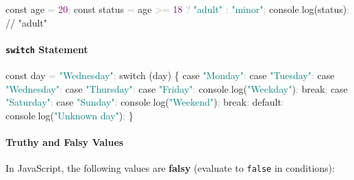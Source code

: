 \documentclass[
  justified,
  openright,
]{tufte-book}
\let\subsubsection\paragraph
\let\paragraph\paragraph
\newcommand{\BuiltInTok}[1]{#1}
\newcommand{\CommentTok}[1]{\textcolor{MidGray}{#1}}
\newcommand{\ControlFlowTok}[1]{\textcolor{BrandBlue}{#1}}
\newcommand{\DecValTok}[1]{\textcolor{Purple}{#1}}
\newcommand{\FunctionTok}[1]{\textcolor{BrandBlue}{#1}}
\newcommand{\KeywordTok}[1]{\textcolor{BrandBlue}{#1}}
\newcommand{\NormalTok}[1]{#1}
\newcommand{\OperatorTok}[1]{\textcolor{DarkGray}{#1}}
\newcommand{\StringTok}[1]{\textcolor{Teal}{#1}}
\newenvironment{Shaded}{%
  \begin{snugshade}
}{%
  \end{snugshade}
}
\let\subsubsection\paragraph
\let\paragraph\paragraph
\begin{document}
\begin{Shaded}
\begin{Highlighting}[]
\KeywordTok{const}\NormalTok{ age }\OperatorTok{=} \DecValTok{20}\OperatorTok{;}
\KeywordTok{const}\NormalTok{ status }\OperatorTok{=}\NormalTok{ age }\OperatorTok{\textgreater{}=} \DecValTok{18} \OperatorTok{?} \StringTok{"adult"} \OperatorTok{:} \StringTok{"minor"}\OperatorTok{;}
\BuiltInTok{console}\OperatorTok{.}\FunctionTok{log}\NormalTok{(status)}\OperatorTok{;} \CommentTok{// "adult"}
\end{Highlighting}
\end{Shaded}

\subsubsection{\texorpdfstring{\texttt{switch}
Statement}{switch Statement}}\label{switch-statement}

\begin{Shaded}
\begin{Highlighting}[]
\KeywordTok{const}\NormalTok{ day }\OperatorTok{=} \StringTok{"Wednesday"}\OperatorTok{;}
\ControlFlowTok{switch}\NormalTok{ (day) \{}
  \ControlFlowTok{case} \StringTok{"Monday"}\OperatorTok{:}
  \ControlFlowTok{case} \StringTok{"Tuesday"}\OperatorTok{:}
  \ControlFlowTok{case} \StringTok{"Wednesday"}\OperatorTok{:}
  \ControlFlowTok{case} \StringTok{"Thursday"}\OperatorTok{:}
  \ControlFlowTok{case} \StringTok{"Friday"}\OperatorTok{:}
    \BuiltInTok{console}\OperatorTok{.}\FunctionTok{log}\NormalTok{(}\StringTok{"Weekday"}\NormalTok{)}\OperatorTok{;}
    \ControlFlowTok{break}\OperatorTok{;}
  \ControlFlowTok{case} \StringTok{"Saturday"}\OperatorTok{:}
  \ControlFlowTok{case} \StringTok{"Sunday"}\OperatorTok{:}
    \BuiltInTok{console}\OperatorTok{.}\FunctionTok{log}\NormalTok{(}\StringTok{"Weekend"}\NormalTok{)}\OperatorTok{;}
    \ControlFlowTok{break}\OperatorTok{;}
  \ControlFlowTok{default}\OperatorTok{:}
    \BuiltInTok{console}\OperatorTok{.}\FunctionTok{log}\NormalTok{(}\StringTok{"Unknown day"}\NormalTok{)}\OperatorTok{;}
\NormalTok{\}}
\end{Highlighting}
\end{Shaded}

\subsubsection{Truthy and Falsy Values}\label{truthy-and-falsy-values}

In JavaScript, the following values are \textbf{falsy} (evaluate to
\texttt{false} in conditions):
\end{document}
